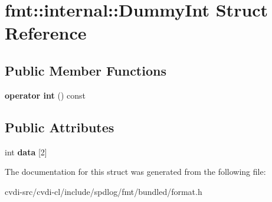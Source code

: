 \hypertarget{structfmt_1_1internal_1_1DummyInt}{}\section{fmt\+:\+:internal\+:\+:Dummy\+Int Struct Reference}
\label{structfmt_1_1internal_1_1DummyInt}
\subsection*{Public Member Functions}
\begin{DoxyCompactItemize}
\item 
{\bfseries operator int} () const \hypertarget{structfmt_1_1internal_1_1DummyInt_a661adc117b3c83ab3aa91aaef0b3bf29}{}\label{structfmt_1_1internal_1_1DummyInt_a661adc117b3c83ab3aa91aaef0b3bf29}

\end{DoxyCompactItemize}
\subsection*{Public Attributes}
\begin{DoxyCompactItemize}
\item 
int {\bfseries data} \mbox{[}2\mbox{]}\hypertarget{structfmt_1_1internal_1_1DummyInt_a0b785da86f9605b7fbebba9014dcfa61}{}\label{structfmt_1_1internal_1_1DummyInt_a0b785da86f9605b7fbebba9014dcfa61}

\end{DoxyCompactItemize}


The documentation for this struct was generated from the following file\+:\begin{DoxyCompactItemize}
\item 
cvdi-\/src/cvdi-\/cl/include/spdlog/fmt/bundled/format.\+h\end{DoxyCompactItemize}
